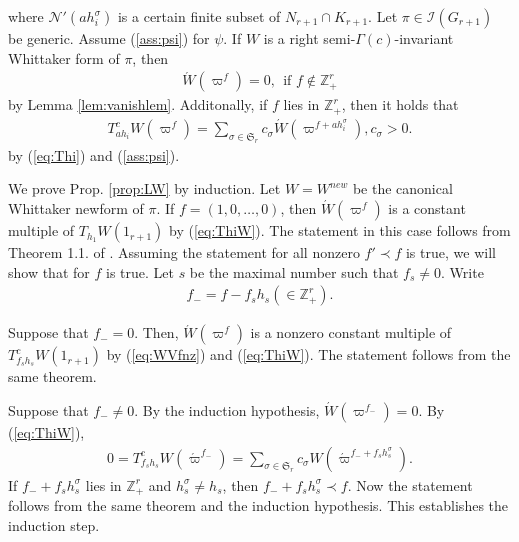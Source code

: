 \documentclass[11pt]{amsart}
\newcommand\s{\sigma}%
\newcommand\Vp{\varpi}%
\newcommand\vp{\varphi}%
\newcommand\Sf{{\mathfrak{S}}}
\newcommand\Z{{\mathbb{Z}}}
\newcommand\Nc{{\mathcal{N}}}
\newcommand\1{\mathbf{1}}
\newcommand\ac{\acute}
\newcommand\Ir{{\mathscr{I}}}
\numberwithin{equation}{section}
\begin{document}
where $\Nc'(ah_i^\s)$ is a certain finite subset of $N_{r+1} \cap K_{r+1}$.
Let $\pi \in \Ir(G_{r+1})$ be generic.
Assume (\ref{ass:psi}) for $\psi$.
If $W$ is a right semi-$\Gamma(c)$-invariant Whittaker form of $\pi$, then 
\begin{align}
\ac{W}(\Vp^f) = 0,  \ \ \mbox{if $f \not\in \Z^r_+$} \label{eq:WVfnz}
\end{align} 
by Lemma \ref{lem:vanishlem}.
Additonally, if $f$ lies in $\Z_+^r$, then it holds that 
\begin{align}
T_{a h_i}^{c} W(\Vp^f) = \sum_{\s \in \Sf_r} c_\s \ac{W}(\Vp^{f+ ah_i^\s}),  c_\s> 0.\label{eq:ThiW}
\end{align} 
by (\ref{eq:Thi}) and (\ref{ass:psi}).

We prove Prop. \ref{prop:LW} by induction.
Let $W = W^{new}$ be the canonical Whittaker newform of $\pi$.
If $f = (1,0 ,\ldots, 0)$, then $\ac{W}(\Vp^f)$ is a constant multiple of $T_{h_1}W(1_{r+1})$ by (\ref{eq:ThiW}).
The statement in this case follows from Theorem 1.1. of \cite{K-Y}.
Assuming the statement for all nonzero $f' \prec f$ is true, we will show that for $f$ is true.
Let $s$ be the maximal number such that $f_s \neq 0$.
Write 
\begin{align*}
f_- = f -f_s h_s (\in \Z_+^r).
\end{align*} 

Suppose that $f_- = 0$.
Then, $\ac{W}(\Vp^f)$ is a nonzero constant multiple of $T_{f_sh_s}^c W(1_{r+1})$ by (\ref{eq:WVfnz}) and (\ref{eq:ThiW}).
The statement follows from the same theorem.

Suppose that $f_- \neq 0$.
By the induction hypothesis, $\ac{W}(\Vp^{f_-}) = 0$.
By (\ref{eq:ThiW}),  
\begin{align*}
0 = T_{f_sh_s}^cW(\ac{\Vp}^{f_-}) = \sum_{\s \in \Sf_r} c_\s W(\ac{\Vp}^{f_-+ f_s h_s^\s}).
\end{align*} 
If $f_-+ f_s h_s^\s$ lies in $\Z_+^r$ and $h_s^\s \neq h_s$, then $f_-+ f_s h_s^\s \prec f$.
Now the statement follows from the same theorem and the induction hypothesis.
This establishes the induction step.
\end{document}
